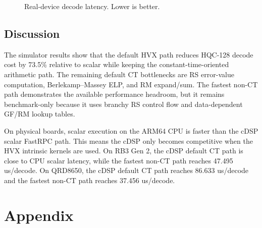 \documentclass[runningheads]{llncs}
\begin{document}
\begin{figure}[t]
\centering
{}
\caption{Real-device decode latency.  Lower is better.}
\label{fig:device-latency}
\end{figure}

\subsection{Discussion}

The simulator results show that the default HVX path reduces HQC-128 decode
cost by 73.5\% relative to scalar while keeping the constant-time-oriented
arithmetic path.  The remaining default CT bottlenecks are RS error-value
computation, Berlekamp--Massey ELP, and RM expand/sum.  The fastest non-CT
path demonstrates the available performance headroom, but it remains
benchmark-only because it uses branchy RS control flow and data-dependent GF/RM
lookup tables.

On physical boards, scalar execution on the ARM64 CPU is faster than the cDSP
scalar FastRPC path.  This means the cDSP only becomes competitive when the HVX
intrinsic kernels are used.  On RB3 Gen 2, the cDSP default CT path is close to
CPU scalar latency, while the fastest non-CT path reaches 47.495 us/decode.  On
QRD8650, the cDSP default CT path reaches 86.633 us/decode and the fastest
non-CT path reaches 37.456 us/decode.









\section{Appendix}

\end{document}
